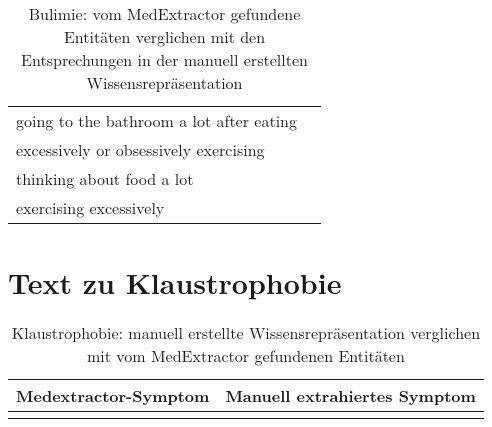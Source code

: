 \begin{table}[H]
\begin{center}
\begin{tabular}{ll}
          going to the bathroom a lot after eating &                \\
             excessively or obsessively exercising &                \\
                         thinking about food a lot &                \\
                            exercising excessively &                \\
\bottomrule
\end{tabular}
\caption{Bulimie: vom MedExtractor gefundene Entitäten verglichen mit den Entsprechungen in der manuell erstellten Wissensrepräsentation}
\label{tab:bulimia_medextractor_manuell}
\end{center}
\end{table}


\section{Text zu Klaustrophobie}
\label{sec:claustrophobia} 

\begin{table}[H]
\begin{center}
\begin{tabular}{ll}
\toprule
  Medextractor-Symptom &                       Manuell extrahiertes Symptom \\
\midrule
                &                                                \\

\bottomrule
\end{tabular}
\caption{Klaustrophobie: manuell erstellte Wissensrepräsentation verglichen mit vom MedExtractor gefundenen Entitäten}
\label{tab:claustrophobia_vergleich_manuell_medextractor}
\end{center}
\end{table}


